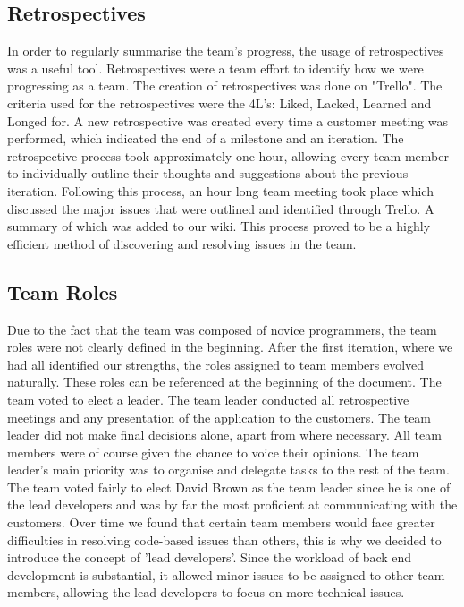 \documentclass{l3proj}
\begin{document}
\subsection{Retrospectives}
\label{retrospective}

In order to regularly summarise the team's progress, the usage of retrospectives was a useful tool. Retrospectives were a team effort to identify how we were progressing as a team. The creation of retrospectives was done on "Trello". The criteria used for the retrospectives were the 4L's: Liked, Lacked, Learned and Longed for. A new retrospective was created every time a customer meeting was performed, which indicated the end of a milestone and an iteration. The retrospective process took approximately one hour, allowing every team member to individually outline their thoughts and suggestions about the previous iteration. Following this process, an hour long team meeting took place which discussed the major issues that were outlined and identified through Trello. A summary of which was added to our wiki. This process proved to be a highly efficient method of discovering and resolving issues in the team.

\subsection{Team Roles}
\label{sec:roles}

Due to the fact that the team was composed of novice programmers, the team roles were not clearly defined in the beginning. After the first iteration, where we had all identified our strengths, the roles assigned to team members evolved naturally. These roles can be referenced at the beginning of the document. The team voted to elect a leader. The team leader conducted all retrospective meetings and any presentation of the application to the customers. The team leader did not make final decisions alone, apart from where necessary. All team members were of course given the chance to voice their opinions. The team leader's main priority was to organise and delegate tasks to the rest of the team. The team voted fairly to elect David Brown as the team leader since he is one of the lead developers and was by far the most proficient at communicating with the customers. Over time we found that certain team members would face greater difficulties in resolving code-based issues than others, this is why we decided to introduce the concept of 'lead developers'. Since the workload of back end development is substantial, it allowed minor issues to be assigned to other team members, allowing the lead developers to focus on more technical issues.
\end{document}
